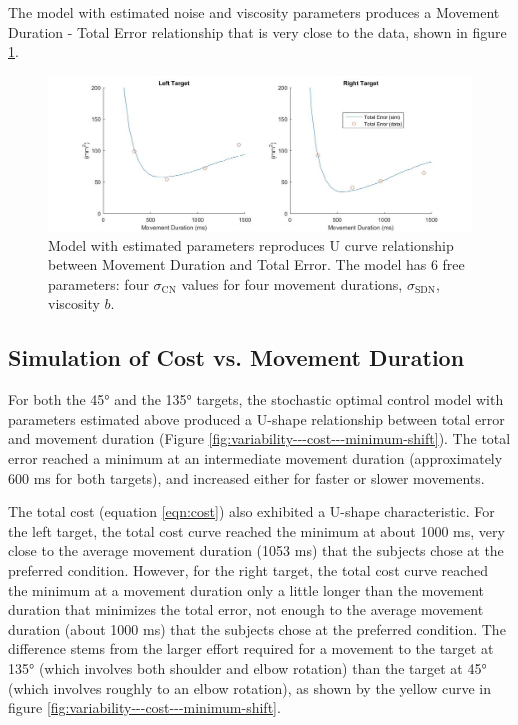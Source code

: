 The model with estimated noise and viscosity parameters produces a Movement Duration - Total Error relationship that is very close to the data, shown in figure \ref{fig:total-error}.

\begin{figure}
	\centering
	\includegraphics[width=\linewidth]{"figures/total error"}
	\caption[Model with estimated parameters reproduces U curve relationship between Movement Duration and Total Error]{Model with estimated parameters reproduces U curve relationship between Movement Duration and Total Error. The model has 6 free parameters: four $\sigma_{\text{CN}}$ values for four movement durations,  $\sigma_{\text{SDN}}$, viscosity $ b $.}
	\label{fig:total-error}
\end{figure}



\subsection{Simulation of Cost vs. Movement Duration}

For both the \ang{45} and the \ang{135} targets, the stochastic optimal control model with parameters estimated above produced a U-shape relationship between total error and movement duration (Figure \ref{fig:variability---cost---minimum-shift}). 
The total error reached a minimum at an intermediate movement duration (approximately 600 ms for both targets), and increased either for faster or slower movements. 

The total cost (equation \ref{eqn:cost}) also exhibited a U-shape characteristic. 
For the left target, the total cost curve reached the minimum at about 1000 ms, very close to the average movement duration (1053 ms) that the subjects chose at the preferred condition. 
However, for the right target, the total cost curve reached the minimum at a movement duration only a little longer than the movement duration that minimizes the total error, not enough to the average movement duration (about 1000 ms) that the subjects chose at the preferred condition.
The difference stems from the larger effort required for a movement to the target at \ang{135} (which involves both shoulder and elbow rotation) than the target at \ang{45} (which involves roughly to an elbow rotation), as shown by the yellow curve in figure \ref{fig:variability---cost---minimum-shift}. 


